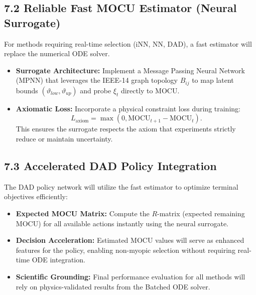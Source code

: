 \documentclass[12pt]{article}
\begin{document}
\subsection*{7.2 Reliable Fast MOCU Estimator (Neural Surrogate)}
For methods requiring real-time selection (iNN, NN, DAD), a fast estimator will replace the numerical ODE solver.
\begin{itemize}
    \item \textbf{Surrogate Architecture:} Implement a Message Passing Neural Network (MPNN) that leverages the IEEE-14 graph topology $B_{ij}$ to map latent bounds $(\vartheta_{low}, \vartheta_{up})$ and probe $\xi_t$ directly to MOCU.
    \item \textbf{Axiomatic Loss:} Incorporate a physical constraint loss during training: 
    \[ L_{\text{axiom}} = \max(0, \text{MOCU}_{t+1} - \text{MOCU}_t). \]
    This ensures the surrogate respects the axiom that experiments strictly reduce or maintain uncertainty.
\end{itemize}

\subsection*{7.3 Accelerated DAD Policy Integration}
The DAD policy network will utilize the fast estimator to optimize terminal objectives efficiently:
\begin{itemize}
    \item \textbf{Expected MOCU Matrix:} Compute the $R$-matrix (expected remaining MOCU) for all available actions instantly using the neural surrogate.
    \item \textbf{Decision Acceleration:} Estimated MOCU values will serve as enhanced features for the policy, enabling non-myopic selection without requiring real-time ODE integration.
    \item \textbf{Scientific Grounding:} Final performance evaluation for all methods will rely on physics-validated results from the Batched ODE solver.
\end{itemize}
\end{document}
